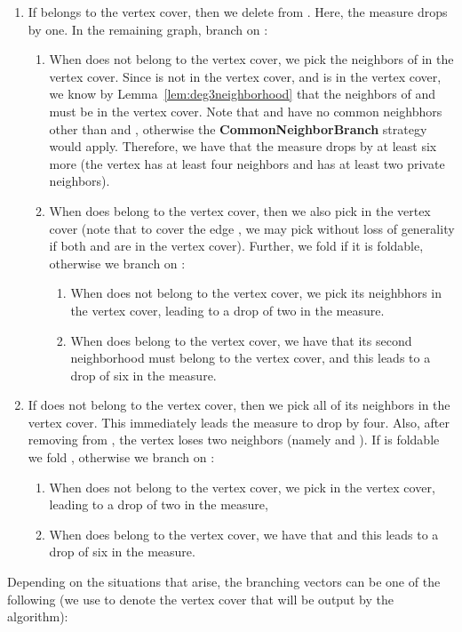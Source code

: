 \documentclass[svgnames]{llncs}
\begin{document}
{\begin{enumerate}[resume=main,label=\bfseries Case~\arabic*:]
\begin{enumdescript}
\begin{enumerate}
\item If  belongs to the vertex cover, then we delete  from . Here, the measure drops by one. In the remaining graph, branch on :
\begin{enumerate}
\item When  does not belong to the vertex cover, we pick the neighbors of  in the vertex cover. Since  is not in the vertex cover, and  is in the vertex cover, we know by 
Lemma~\ref{lem:deg3neighborhood} that the neighbors of  and  must be in the vertex cover. Note that  and  have no common neighbhors other than  and , otherwise the {\bf CommonNeighborBranch} strategy
would apply. Therefore, we have that the measure drops by at least six more (the vertex  has at least four neighbors and  has at least two private neighbors). 
\item When  does belong to the vertex cover, then we also pick  in the vertex cover (note that to cover the edge , we may pick  without loss of generality if both  and  are in
the vertex cover). Further, we fold  if it is foldable, otherwise we branch on :
\begin{enumerate}
\item When  does not belong to the vertex cover, we pick its neighbhors in the vertex cover, leading to a drop of two in the measure.
\item When  does belong to the vertex cover, we have that its second neighborhood must belong to the vertex cover, and this leads to a drop of six in the measure.
\end{enumerate} 
\end{enumerate}    
\item If  does not belong to the vertex cover, then we pick all of its neighbors in the vertex cover. This immediately leads the measure to drop by four. Also, after removing  from , the vertex  loses
two neighbors (namely  and ). If  is foldable we fold , otherwise we branch on :
\begin{enumerate}  
\item When  does not belong to the vertex cover, we pick  in the vertex cover, leading to a drop of two in the measure,
\item When  does belong to the vertex cover, we have that  and this leads to a drop of six in the measure. 
\end{enumerate}
\end{enumerate}


Depending on the situations that arise, the branching vectors can be one of the following (we use  to denote the vertex cover that will be output by the algorithm):


\end{enumdescript}
\end{enumerate}}
\end{document}
